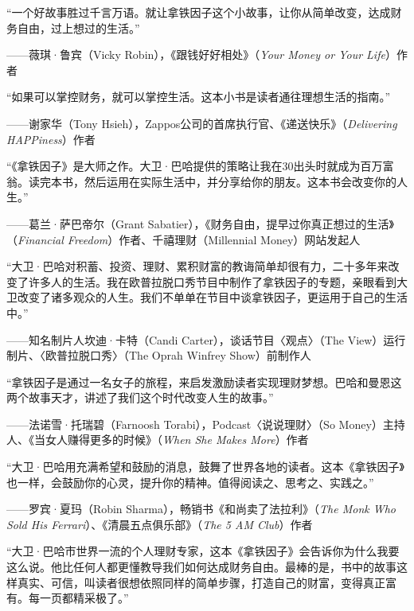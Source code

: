 “一个好故事胜过千言万语。就让拿铁因子这个小故事，让你从简单改变，达成财务自由，过上想过的生活。”

{\kaishu \hfill ——薇琪·鲁宾（Vicky Robin），《跟钱好好相处》（\textit{Your Money or Your Life}）作者}\vspace{1em}

“如果可以掌控财务，就可以掌控生活。这本小书是读者通往理想生活的指南。”

{\kaishu \hfill ——谢家华（Tony Hsieh），Zappos公司的首席执行官、《递送快乐》（\textit{Delivering HAPPiness}）作者}\vspace{1em}

“《拿铁因子》是大师之作。大卫·巴哈提供的策略让我在30出头时就成为百万富翁。读完本书，然后运用在实际生活中，并分享给你的朋友。这本书会改变你的人生。”

{\kaishu \hfill ——葛兰·萨巴帝尔（Grant Sabatier），《财务自由，提早过你真正想过的生活》（\textit{Financial Freedom}）作者、千禧理财（Millennial Money）网站发起人}\vspace{1em}

“大卫·巴哈对积蓄、投资、理财、累积财富的教诲简单却很有力，二十多年来改变了许多人的生活。我在欧普拉脱口秀节目中制作了拿铁因子的专题，亲眼看到大卫改变了诸多观众的人生。我们不单单在节目中谈拿铁因子，更运用于自己的生活中。”

{\kaishu \hfill ——知名制片人坎迪·卡特（Candi Carter），谈话节目〈观点〉（The View）运行制片、〈欧普拉脱口秀〉（The Oprah Winfrey Show）前制作人}\vspace{1em}

“拿铁因子是通过一名女子的旅程，来启发激励读者实现理财梦想。巴哈和曼恩这两个故事天才，讲述了我们这个时代改变人生的故事。”

{\kaishu \hfill ——法诺雪·托瑞碧（Farnoosh Torabi），Podcast〈说说理财〉（So Money）主持人、《当女人赚得更多的时候》（\textit{When She Makes More}）作者}\vspace{1em}

“大卫·巴哈用充满希望和鼓励的消息，鼓舞了世界各地的读者。这本《拿铁因子》也一样，会鼓励你的心灵，提升你的精神。值得阅读之、思考之、实践之。”

{\kaishu \hfill ——罗宾·夏玛（Robin Sharma），畅销书《和尚卖了法拉利》（\textit{The Monk Who Sold His Ferrari}）、《清晨五点俱乐部》（\textit{The 5 AM Club}）作者}\vspace{1em}

“大卫·巴哈市世界一流的个人理财专家，这本《拿铁因子》会告诉你为什么我要这么说。他比任何人都更懂教导我们如何达成财务自由。最棒的是，书中的故事这样真实、可信，叫读者很想依照同样的简单步骤，打造自己的财富，变得真正富有。每一页都精采极了。”

